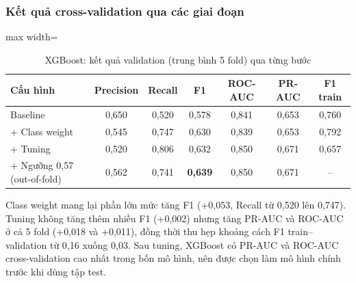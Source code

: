 \subsubsection{Kết quả cross-validation qua các giai đoạn}
\begin{table}[H]
\centering
\small
\begin{adjustbox}{max width=\textwidth}
\begin{tabular}{|l|c|c|c|c|c|c|}
\hline
\textbf{Cấu hình} & \textbf{Precision} & \textbf{Recall} & \textbf{F1} & \textbf{ROC-AUC} & \textbf{PR-AUC} & \textbf{F1 train} \\
\hline
Baseline & 0,650 & 0,520 & 0,578 & 0,841 & 0,653 & 0,760 \\
\hline
+ Class weight & 0,545 & 0,747 & 0,630 & 0,839 & 0,653 & 0,792 \\
\hline
+ Tuning & 0,520 & 0,806 & 0,632 & 0,850 & 0,671 & 0,657 \\
\hline
+ Ngưỡng 0,57 (out-of-fold) & 0,562 & 0,741 & \textbf{0,639} & 0,850 & 0,671 & -- \\
\hline
\end{tabular}
\end{adjustbox}
\caption{XGBoost: kết quả validation (trung bình 5 fold) qua từng bước}
\end{table}

Class weight mang lại phần lớn mức tăng F1 (+0,053, Recall từ 0,520 lên 0,747). Tuning không tăng thêm nhiều F1 (+0,002) nhưng tăng PR-AUC và ROC-AUC ở cả 5 fold (+0,018 và +0,011), đồng thời thu hẹp khoảng cách F1 train--validation từ 0,16 xuống 0,03. Sau tuning, XGBoost có PR-AUC và ROC-AUC cross-validation cao nhất trong bốn mô hình, nên được chọn làm mô hình chính trước khi dùng tập test.

